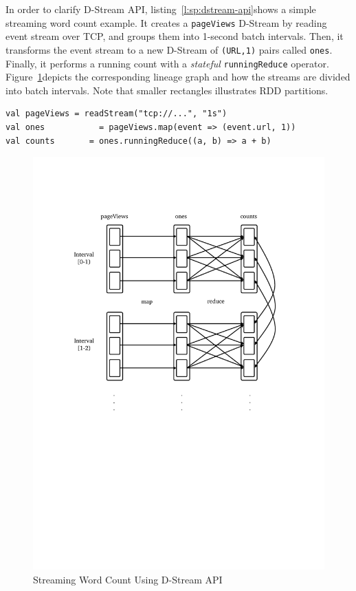 In order to clarify D-Stream API, listing~\ref{l:sp:dstream-api}\footnotemark shows a simple streaming word count example. It creates a \lstinline$pageViews$ D-Stream by
reading event stream over TCP, and groups them into 1-second batch intervals. Then, it transforms the event stream to a new D-Stream of \lstinline$(URL,1)$ pairs called
\lstinline$ones$. Finally, it performs a running count with a \emph{stateful} \lstinline$runningReduce$ operator. Figure~\ref{fig:sp:dstream-api}\footnotemark[\value{footnote}] depicts the corresponding lineage graph and how the streams are divided into batch intervals. Note that smaller rectangles illustrates RDD partitions.
\begin{lstlisting}[float=h, caption={Streaming Word Count using D-Stream API},label={l:sp:dstream-api},captionpos=b,morekeywords={val}]
val pageViews = readStream("tcp://...", "1s")
val ones           = pageViews.map(event => (event.url, 1))
val counts       = ones.runningReduce((a, b) => a + b)
\end{lstlisting}
\begin{figure}[h]
    \centering
    \includegraphics[clip,trim=2.5cm 11cm 3cm 4cm]{dstream-example.pdf}
    \caption{Streaming Word Count Using D-Stream API}
    \label{fig:sp:dstream-api}
\end{figure}

